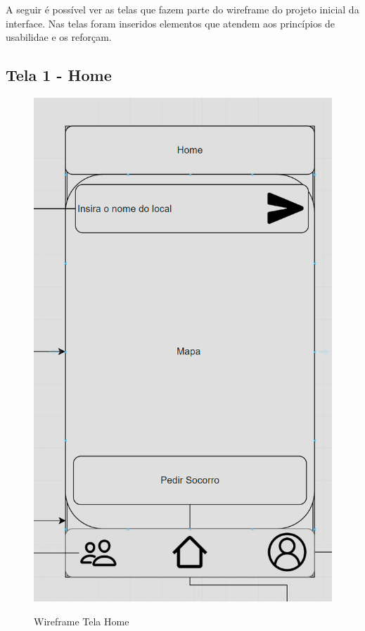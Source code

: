 A seguir é possível ver as telas que fazem parte do wireframe do projeto inicial da interface. Nas telas foram inseridos elementos que atendem aos princípios de usabilidae e os reforçam.
\subsection{Tela 1 - Home}
\begin{figure}[h]
  \begin{center}
  \includegraphics[width=0.2\linewidth]{images/wire-tela-home.png}\\
  \end{center}
  \caption[Wireframe Tela Home]{Wireframe Tela Home}
  \label{fig:wireframe-tela-home}
\end{figure}
\pagebreak
